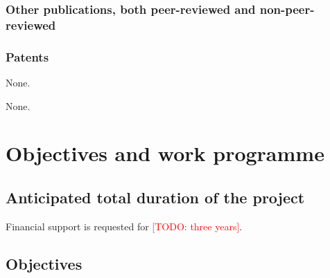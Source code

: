 \documentclass[american,firsttime]{dfgproposal}
\newcommand{\todo}[1]{\xspace{\textcolor{red}{[TODO: #1]}}\xspace}
\begin{document}
	\subsubsection{Other publications, both peer-reviewed and non-peer-reviewed}
	\printbibliography[category=nonreviewed, heading=none, env=bibliographyNUM]
	
	
	\subsubsection{Patents}
	\printbibliography[category=patents_pending, heading=none]
	None.
	
	\printbibliography[category=patents, heading=none]
	None.
	
	
	\section{Objectives and work programme}
	
	\subsection{Anticipated total duration of the project}
	Financial support is requested for \todo{three years}.
	
	\subsection{Objectives}
	
\end{document}
